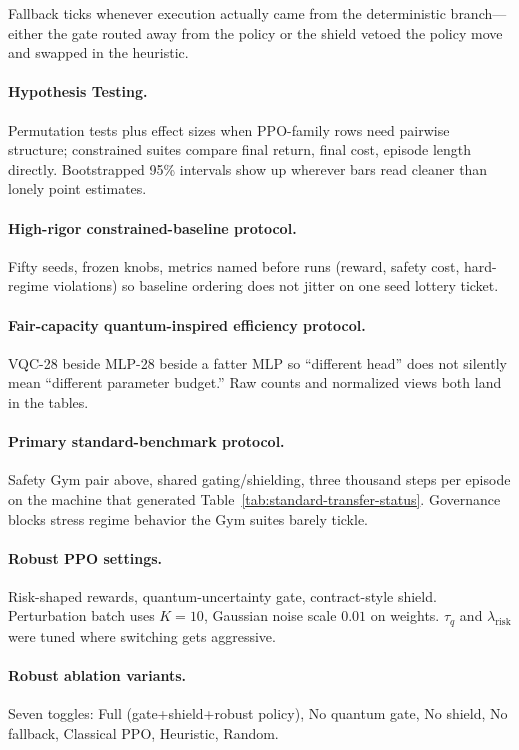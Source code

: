 Fallback ticks whenever execution actually came from the deterministic branch---either the gate routed away from the policy or the shield vetoed the policy move and swapped in the heuristic.

\paragraph{Hypothesis Testing.}
Permutation tests plus effect sizes when PPO-family rows need pairwise structure; constrained suites compare final return, final cost, episode length directly. Bootstrapped 95\% intervals show up wherever bars read cleaner than lonely point estimates.

\paragraph{High-rigor constrained-baseline protocol.}
Fifty seeds, frozen knobs, metrics named before runs (reward, safety cost, hard-regime violations) so baseline ordering does not jitter on one seed lottery ticket.

\paragraph{Fair-capacity quantum-inspired efficiency protocol.}
VQC-28 beside MLP-28 beside a fatter MLP so ``different head'' does not silently mean ``different parameter budget.'' Raw counts and normalized views both land in the tables.

\paragraph{Primary standard-benchmark protocol.}
Safety Gym pair above, shared gating/shielding, three thousand steps per episode on the machine that generated Table~\ref{tab:standard-transfer-status}. Governance blocks stress regime behavior the Gym suites barely tickle.

\paragraph{Robust PPO settings.}
Risk-shaped rewards, quantum-uncertainty gate, contract-style shield. Perturbation batch uses $K{=}10$, Gaussian noise scale $0.01$ on weights. $\tau_q$ and $\lambda_{\mathrm{risk}}$ were tuned where switching gets aggressive.

\paragraph{Robust ablation variants.}
Seven toggles: Full (gate+shield+robust policy), No quantum gate, No shield, No fallback, Classical PPO, Heuristic, Random.
